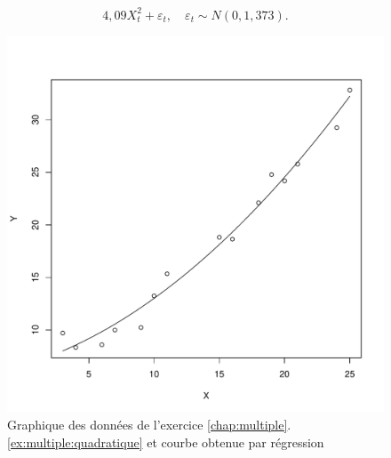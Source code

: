 \begin{solution}{3.16}
\begin{displaymath}
      4,09 X_t^2 + \varepsilon_t, \quad
      \varepsilon_t \sim N(0, 1,373).
    \end{displaymath}
    \begin{figure}
      \centering
\begin{knitrout}
\color{fgcolor}\begin{kframe}
\begin{alltt}
 \hlopt{~}   
 \hlkwb{<-} \hlstd{(}\hlopt{$} \hlopt{$}  \hlstd{=} \hlstd{)}
  \hlstd{(}   \hlstd{=} \hlstd{))}
\end{alltt}
\end{kframe}
\includegraphics[width=\maxwidth]{figure/unnamed-chunk-41-1}

\end{knitrout}
      \caption{Graphique des données de l'exercice
        \ref{chap:multiple}.\ref{ex:multiple:quadratique} et courbe
        obtenue par régression}
      \label{fig:multiple:quadratique2}
    \end{figure}
  
\end{solution}
